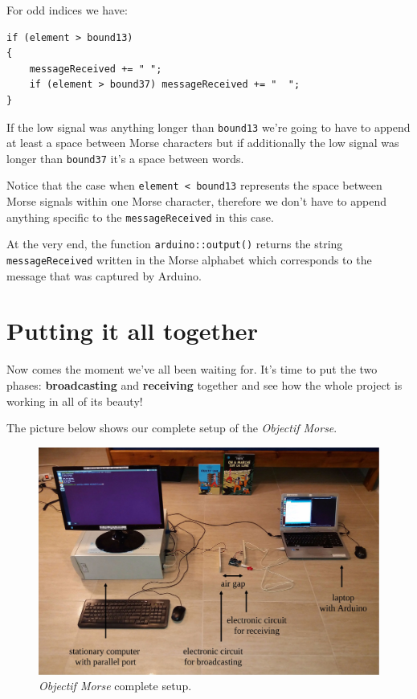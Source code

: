 \documentclass[12pt]{report}
\begin{document}
\newpage

For odd indices we have:

\begin{lstlisting}
if (element > bound13)
{
	messageReceived += " ";
	if (element > bound37) messageReceived += "  ";
}
\end{lstlisting}

If the low signal was anything longer than \texttt{bound13} we're going to have to append at least a space between Morse characters but if additionally the low signal was longer than \texttt{bound37} it's a space between words.

Notice that the case when \texttt{element < bound13} represents the space between Morse signals within one Morse character, therefore we don't have to append anything specific to the \texttt{messageReceived} in this case.

At the very end, the function \texttt{arduino::output()} returns the string \texttt{messageReceived} written in the Morse alphabet which corresponds to the message that was captured by Arduino.

\chapter{Putting it all together}

Now comes the moment we've all been waiting for. It's time to put the two phases: \textbf{broadcasting} and \textbf{receiving} together and see how the whole project is working in all of its beauty!

The picture below shows our complete setup of the \textit{Objectif Morse}.

\begin{figure}[H]
\centering\includegraphics[width=14.5cm]{full_setup}
\caption{\textit{Objectif Morse} complete setup.}				
\label{fig:full_setup}
\end{figure}
\end{document}
